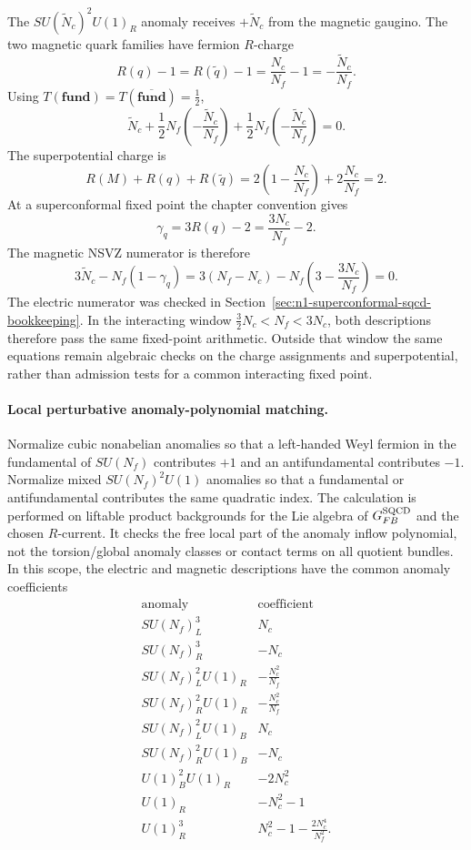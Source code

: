 The \(SU(\widetilde N_c)^2U(1)_R\) anomaly receives \(+\widetilde N_c\)
from the magnetic gaugino.  The two magnetic quark families have fermion
\(R\)-charge
\[
  R(q)-1=R(\widetilde q)-1
  =
  \frac{N_c}{N_f}-1
  =
  -\frac{\widetilde N_c}{N_f}.
\]
Using \(T(\mathbf{fund})=T(\overline{\mathbf{fund}})=\frac12\),
\[
  \widetilde N_c
  +\frac12N_f\left(-\frac{\widetilde N_c}{N_f}\right)
  +\frac12N_f\left(-\frac{\widetilde N_c}{N_f}\right)
  =
  0 .
\]
The superpotential charge is
\[
  R(M)+R(q)+R(\widetilde q)
  =
  2\left(1-\frac{N_c}{N_f}\right)
  +2\frac{N_c}{N_f}
  =
  2 .
\]
At a superconformal fixed point the chapter convention gives
\[
  \gamma_q=3R(q)-2=\frac{3N_c}{N_f}-2 .
\]
The magnetic NSVZ numerator is therefore
\[
  3\widetilde N_c-N_f(1-\gamma_q)
  =
  3(N_f-N_c)
  -N_f\left(3-\frac{3N_c}{N_f}\right)
  =
  0 .
\]
The electric numerator was checked in
Section~\ref{sec:n1-superconformal-sqcd-bookkeeping}.  In the interacting
window \(\frac32N_c<N_f<3N_c\), both descriptions therefore pass the same
fixed-point arithmetic.  Outside that window the same equations remain
algebraic checks on the charge assignments and superpotential, rather than
admission tests for a common interacting fixed point.

\paragraph{Local perturbative anomaly-polynomial matching.}
\label{par:sqcd-seiberg-anomaly-matching}
Normalize cubic nonabelian anomalies so that a left-handed Weyl fermion in
the fundamental of \(SU(N_f)\) contributes \(+1\) and an antifundamental
contributes \(-1\).  Normalize mixed \(SU(N_f)^2U(1)\) anomalies so that a
fundamental or antifundamental contributes the same quadratic index.  The
calculation is performed on liftable product backgrounds for the Lie algebra
of \(G_{FB}^{\rm SQCD}\) and the chosen \(R\)-current.  It checks the free
local part of the anomaly inflow polynomial, not the torsion/global anomaly
classes or contact terms on all quotient bundles.  In this scope, the
electric and magnetic descriptions have the common anomaly coefficients
\[
\begin{array}{c|c}
  \text{anomaly} & \text{coefficient} \\ \hline
  SU(N_f)_L^3 & N_c \\
  SU(N_f)_R^3 & -N_c \\
  SU(N_f)_L^2U(1)_R & -\frac{N_c^2}{N_f} \\
  SU(N_f)_R^2U(1)_R & -\frac{N_c^2}{N_f} \\
  SU(N_f)_L^2U(1)_B & N_c \\
  SU(N_f)_R^2U(1)_B & -N_c \\
  U(1)_B^2U(1)_R & -2N_c^2 \\
  U(1)_R & -N_c^2-1 \\
  U(1)_R^3 & N_c^2-1-\frac{2N_c^4}{N_f^2}.
\end{array}
\]

